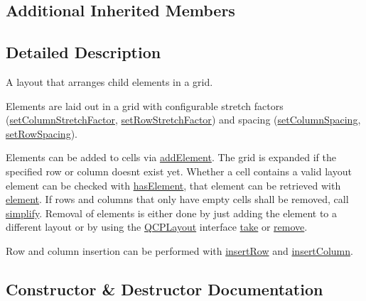 \subsection*{Additional Inherited Members}


\subsection{Detailed Description}
A layout that arranges child elements in a grid. 

Elements are laid out in a grid with configurable stretch factors (\hyperlink{classQCPLayoutGrid_ae38f31a71687b9d7ee3104852528fb50}{set\+Column\+Stretch\+Factor}, \hyperlink{classQCPLayoutGrid_a7b0273de5369bd93d942edbaf5b166ec}{set\+Row\+Stretch\+Factor}) and spacing (\hyperlink{classQCPLayoutGrid_a3a49272aba32bb0fddc3bb2a45a3dba0}{set\+Column\+Spacing}, \hyperlink{classQCPLayoutGrid_aaef2cd2d456197ee06a208793678e436}{set\+Row\+Spacing}).

Elements can be added to cells via \hyperlink{classQCPLayoutGrid_adff1a2ca691ed83d2d24a4cd1fe17012}{add\+Element}. The grid is expanded if the specified row or column doesn\textquotesingle{}t exist yet. Whether a cell contains a valid layout element can be checked with \hyperlink{classQCPLayoutGrid_ab0cf4f7edc9414a3bfaddac0f46dc0a0}{has\+Element}, that element can be retrieved with \hyperlink{classQCPLayoutGrid_a525f25e6ba43ee228151d074251b4e6a}{element}. If rows and columns that only have empty cells shall be removed, call \hyperlink{classQCPLayoutGrid_a08bba60e4acd20165526a8fd7f986b58}{simplify}. Removal of elements is either done by just adding the element to a different layout or by using the \hyperlink{classQCPLayout}{Q\+C\+P\+Layout} interface \hyperlink{classQCPLayoutGrid_a666a9fe9e92054436f9b66eba25cca0c}{take} or \hyperlink{classQCPLayout_a6c58f537d8086f352576ab7c5b15d0bc}{remove}.

Row and column insertion can be performed with \hyperlink{classQCPLayoutGrid_a48af3dd7c3a653d9c3d7dd99bd02e838}{insert\+Row} and \hyperlink{classQCPLayoutGrid_a1e880a321dbe8b43b471ccd764433dc4}{insert\+Column}. 

\subsection{Constructor \& Destructor Documentation}
\hypertarget{classQCPLayoutGrid_ab2a4c1587dc8aed4c41c509c8d8d2a64}{}

